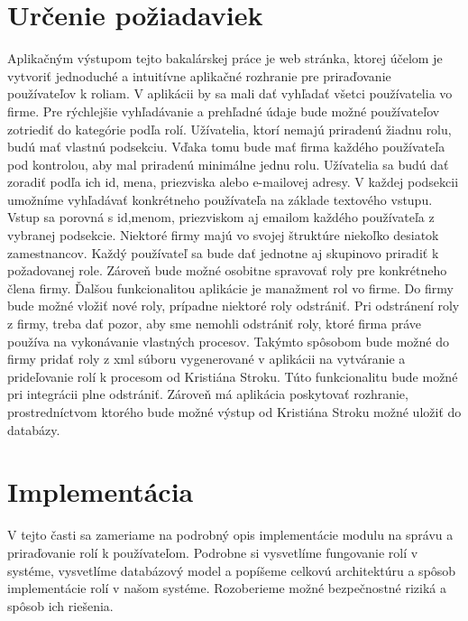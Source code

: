 

\section{Určenie požiadaviek}
Aplikačným výstupom tejto bakalárskej práce je web stránka, ktorej účelom je vytvoriť jednoduché a intuitívne aplikačné rozhranie pre priraďovanie používateľov k roliam. V aplikácii by sa mali dať vyhľadať všetci používatelia vo firme. Pre rýchlejšie vyhľadávanie a prehľadné údaje bude možné používateľov zotriediť do kategórie podľa rolí. Užívatelia, ktorí nemajú priradenú žiadnu rolu, budú mať vlastnú podsekciu. Vďaka tomu bude mať firma každého používateľa pod kontrolou, aby mal priradenú minimálne jednu rolu. Užívatelia sa budú dať zoradiť podľa ich id, mena, priezviska alebo e-mailovej adresy. V každej podsekcii umožníme vyhľadávať konkrétneho používateľa na základe textového vstupu. Vstup sa porovná s id,menom, priezviskom aj emailom každého používateľa z vybranej podsekcie. Niektoré firmy majú vo svojej štruktúre niekoľko desiatok zamestnancov.   Každý používateľ sa bude dať jednotne aj skupinovo priradiť k požadovanej role. Zároveň bude možné osobitne spravovať roly pre konkrétneho člena firmy. Ďalšou funkcionalitou aplikácie je manažment rol vo firme. Do firmy bude možné vložiť nové roly, prípadne niektoré roly odstrániť. Pri odstránení roly z firmy, treba dať pozor, aby sme nemohli odstrániť roly, ktoré firma práve používa na vykonávanie vlastných procesov. Takýmto spôsobom bude možné do firmy pridať roly z xml súboru vygenerované v aplikácii na vytváranie a prideľovanie rolí k procesom od Kristiána Stroku. Túto funkcionalitu bude možné pri integrácii plne odstrániť. Zároveň má aplikácia poskytovať rozhranie, prostredníctvom ktorého  bude možné výstup od Kristiána Stroku možné uložiť do databázy. 


\section{Implementácia}
V tejto časti sa zameriame na podrobný opis implementácie modulu na správu a priraďovanie rolí k používateľom. Podrobne si vysvetlíme fungovanie rolí v systéme, vysvetlíme databázový model a popíšeme celkovú architektúru a spôsob implementácie rolí v našom systéme. Rozoberieme možné bezpečnostné riziká a spôsob ich riešenia.

